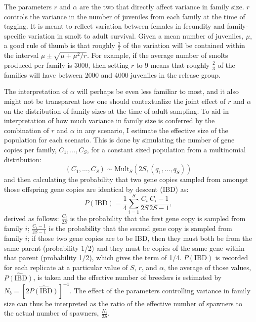 \documentclass[11pt]{article}
\begin{document}
The parameters $r$ and $\alpha$ are the two that directly affect variance in family size.  $r$ 
controls the variance in the number of juveniles from each family at the time of tagging.  It is meant
to reflect variation between females in fecundity and family-specific variation in smolt to adult survival.  
Given a mean number of juveniles, $\mu$, a good rule of thumb is that roughly $\frac{2}{3}$ 
of the variation will be contained
within the interval $\mu \pm \sqrt{\mu + \mu^2/r}$.  For example, if the average number of smolts produced
per family is 3000, then setting $r$ to 9 means that roughly $\frac{2}{3}$ of the families will have
between 2000 and 4000 juveniles in the release group.


The interpretation of $\alpha$ will perhaps be even less familiar to most, and it also might not
be transparent how one should contextualize the joint effect of $r$ and $\alpha$ on the distribution
of family sizes at the time of adult sampling.  To aid in interpretation of how much variance in
family size is conferred by the combination of $r$ and $\alpha$ in any scenario, I estimate the
effective size of the population for each scenario.  This is done by simulating the number of
gene copies per family, $C_1,\ldots,C_S$,
for a constant sized population from a multinomial distribution:
\[
(C_1,\ldots, C_S) \sim \mathrm{Mult}_S(2S, (q_1, \ldots, q_S))
\]
and then calculating the probability that two gene copies sampled from amongst those offspring gene copies
are identical by descent (IBD) as:
\[
P(\mathrm{IBD}) = \frac{1}{4}\sum_{i=1}^S \frac{C_i}{2S}\frac{C_i - 1}{2S - 1},
\]
derived as follows: $\frac{C_i}{2S}$ is the probability that the first gene copy is sampled from family $i$;
$\frac{C_i - 1}{2S - 1}$ is the probability that the second gene copy is sampled from family $i$; if those two
gene copies are to be IBD, then they must both be from the same parent (probability 1/2) and they must be copies of
the same gene within that parent (probability 1/2), which gives the term of 1/4.  
$P(\mathrm{IBD})$ is recorded for each replicate at a particular value of $S$, $r$, and $\alpha$, the average
of those values, $\widehat{P(\mathrm{IBD})}$, is taken and the effective number of breeders is estimated
by $N_b = [2\widehat{P(\mathrm{IBD})}]^{-1}$.   The effect of the parameters controlling
variance in family size can thus be interpreted as the ratio of the effective number of spawners to the 
actual number of spawners, $\frac{N_b}{2S}$.
\end{document}
